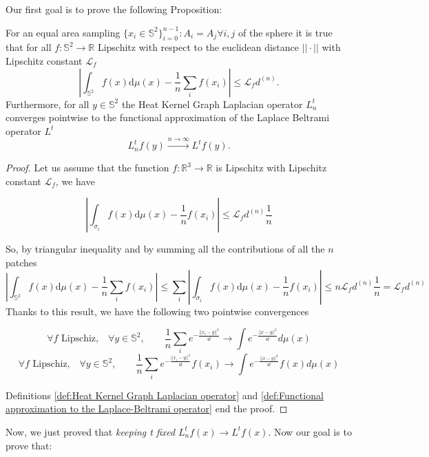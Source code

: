 Our first goal is to prove the following Proposition: 
\vspace{0.5cm}
\begin{prop}\label{prop:1}
	For an equal area sampling $\{x_i\in\mathbb S^2\}_{i=0}^{n-1}: A_i=A_j \forall i,j$ of the sphere it is true that for all $f: \mathbb S^2 \rightarrow \mathbb R$ Lipschitz with respect to the euclidean distance $||\cdot||$ with Lipschitz constant $\mathcal L_f$ 
	$$
	\left| \int_{\mathbb S^2}f({ x})\text{d}{\mu(x)} - \frac{1}{n}\sum_i f( x_i)\right|\leq \mathcal L_fd^{(n)}.
	$$
	Furthermore, for all $y\in\mathbb S^2$ the Heat Kernel Graph Laplacian operator $L^t_n$ converges pointwise to the functional approximation of the Laplace Beltrami operator $L^t$
	$$ L_n^tf(y)\xrightarrow{n\to\infty} L^tf(y).$$
\end{prop} 
\vspace{0.5cm}


\begin{proof}
	Let us assume that the function $f:\mathbb R^3\rightarrow \mathbb R$ is Lipschitz with Lipschitz constant $\mathcal L_f$, we have 
	
	$$\left| \int_{\sigma_{i}}f({ x})\text{d}{\mu(x)} - \frac{1}{n}f( x_i)\right| \leq \mathcal L_fd^{(n)}\frac{1}{n} $$

	So, by triangular inequality and by summing all the contributions of all the $n$ patches
	$$\left| \int_{\mathbb S^2}f({ x})\text{d}{\mu(x)} - \frac{1}{n}\sum_i f( x_i)\right| \leq \sum_i \left| \int_{\sigma_{i}}f({ x})\text{d}{\mu(x)} - \frac{1}{n}f( x_i)\right|\leq n  \mathcal L_fd^{(n)}\frac{1}{n} = \mathcal L_fd^{(n)}$$	
	Thanks to this result, we have the following two pointwise convergences
	
	$$\forall f \text{ Lipschiz,}\quad \forall y\in\mathbb S^2,  \quad\quad \frac{1}{n}\sum_i e^{-\frac{||x_i-y||^2}{4t}}\rightarrow \int e^{-\frac{||x-y||^2}{4t}}d\mu(x)$$
	$$\forall f \text{ Lipschiz,}\quad \forall y\in\mathbb S^2,  \quad\quad \frac{1}{n}\sum_i e^{-\frac{||x_i-y||^2}{4t}}f(x_i)\rightarrow \int e^{-\frac{||x-y||^2}{4t}}f(x)d\mu(x)$$
	
	Definitions \ref{def:Heat Kernel Graph Laplacian operator} and \ref{def:Functional approximation to the Laplace-Beltrami operator} end the proof.
\end{proof}
\vspace{0.5cm}

Now, we just proved that \textit{keeping t fixed} $L_n^tf(x)\rightarrow L^tf(x)$. Now our goal is to prove that:

